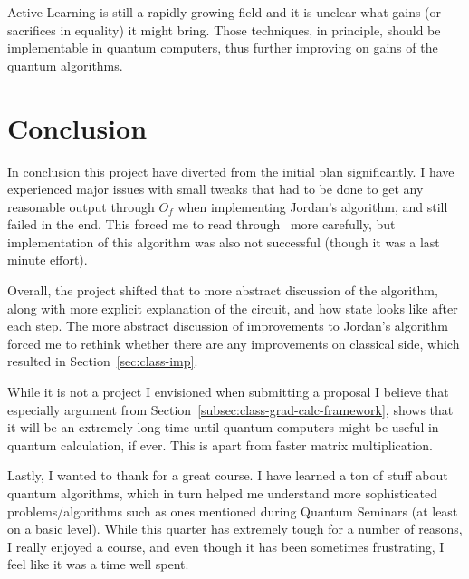 \documentclass{article}
\begin{document}
Active Learning is still a rapidly growing field and it is unclear what gains (or sacrifices in equality) it might bring.
Those techniques, in principle, should be implementable in quantum computers, thus further improving on gains of the quantum algorithms.

\section{Conclusion}
\label{sec:conclusion}
In conclusion this project have diverted from the initial plan significantly.
I have experienced major issues with small tweaks that had to be done to get any reasonable output through $O_f$ when implementing Jordan's algorithm,
and still failed in the end. This forced me to read through~\cite{Gily_n_2019} more carefully, but implementation of this algorithm
was also not successful (though it was a last minute effort).

Overall, the project shifted that to more abstract discussion of the algorithm, along with more explicit explanation of the circuit, and
how state looks like after each step. The more abstract discussion of improvements to Jordan's algorithm forced me to rethink whether there are
any improvements on classical side, which resulted in Section~\ref{sec:class-imp}.

While it is not a project I envisioned when submitting a proposal I believe that especially argument from Section~\ref{subsec:class-grad-calc-framework},
shows that it will be an extremely long time until quantum computers might be useful in quantum calculation, if ever. This is apart from faster matrix multiplication.

Lastly, I wanted to thank for a great course. I have learned a ton of stuff about quantum algorithms, which in turn helped me understand more
sophisticated problems/algorithms such as ones mentioned during Quantum Seminars (at least on a basic level). While this quarter has extremely tough
for a number of reasons, I really enjoyed a course, and even though it has been sometimes frustrating, I feel like it was a time well spent.

\printbibliography
\end{document}
